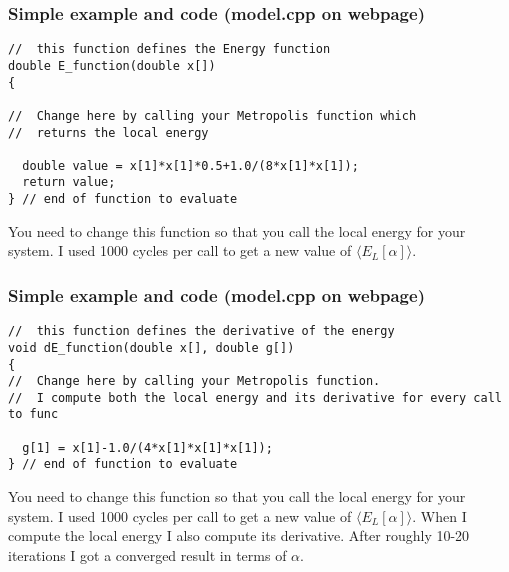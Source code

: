 \documentclass{beamer}
\begin{document}
\begin{frame}
\frametitle{Simple example and code (model.cpp on webpage)}

\begin{block}{}
\begin{verbatim}
//  this function defines the Energy function
double E_function(double x[])
{

//  Change here by calling your Metropolis function which 
//  returns the local energy

  double value = x[1]*x[1]*0.5+1.0/(8*x[1]*x[1]);
  return value;
} // end of function to evaluate
\end{verbatim}
You need to change this function so that you call the local energy for your system. I used 1000
cycles per call to get a new value of $\langle E_L[\alpha]\rangle$.
\end{block}
\end{frame}

\begin{frame}
\frametitle{Simple example and code (model.cpp on webpage)}

\begin{block}{}
\begin{verbatim}
//  this function defines the derivative of the energy 
void dE_function(double x[], double g[])
{
//  Change here by calling your Metropolis function. 
//  I compute both the local energy and its derivative for every call to func

  g[1] = x[1]-1.0/(4*x[1]*x[1]*x[1]);
} // end of function to evaluate
\end{verbatim}
You need to change this function so that you call the local energy for your system. I used 1000
cycles per call to get a new value of $\langle E_L[\alpha]\rangle$.
When I compute the local energy I also compute its derivative.
After roughly 10-20 iterations I got a converged result in terms of $\alpha$.
\end{block}
\end{frame}
\end{document}
